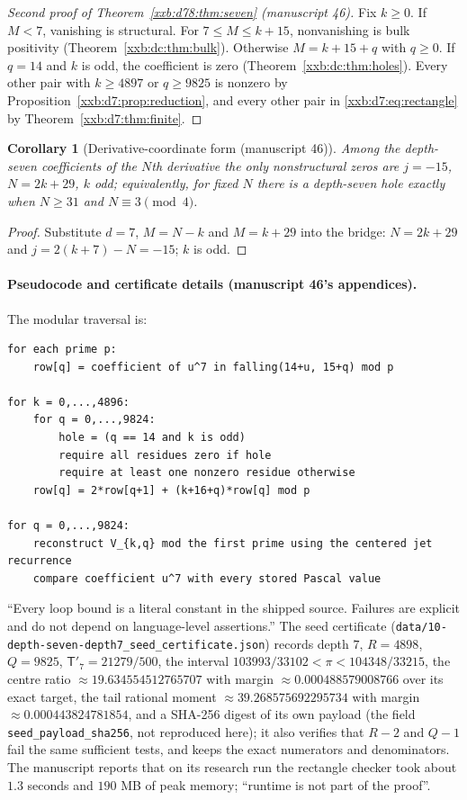 \documentclass[11pt,a4paper]{article}
\numberwithin{equation}{section}
\newtheorem{corollary}[theorem]{Corollary}
\theoremstyle{definition}
\theoremstyle{remark}
\theoremstyle{plain}
\begin{document}
\begin{proof}[Second proof of Theorem~\ref{xxb:d78:thm:seven} (manuscript 46)]
Fix $k\ge0$.  If $M<7$, vanishing is structural.  For $7\le M\le k+15$,
nonvanishing is bulk positivity (Theorem~\ref{xxb:dc:thm:bulk}).  Otherwise
$M=k+15+q$ with $q\ge0$.  If $q=14$ and $k$ is odd, the coefficient is zero
(Theorem~\ref{xxb:dc:thm:holes}).  Every other pair with $k\ge4897$ or
$q\ge9825$ is nonzero by Proposition~\ref{xxb:d7:prop:reduction}, and every
other pair in \eqref{xxb:d7:eq:rectangle} by
Theorem~\ref{xxb:d7:thm:finite}.
\end{proof}

\begin{corollary}[Derivative-coordinate form (manuscript 46)]\label{xxb:d7:cor:derivative}
Among the depth-seven coefficients of the $N$th derivative the only
nonstructural zeros are $j=-15$, $N=2k+29$, $k$ odd; equivalently, for fixed
$N$ there is a depth-seven hole exactly when $N\ge31$ and $N\equiv3\pmod4$.
\end{corollary}
\begin{proof}
Substitute $d=7$, $M=N-k$ and $M=k+29$ into the bridge: $N=2k+29$ and
$j=2(k+7)-N=-15$; $k$ is odd.
\end{proof}

\paragraph{Pseudocode and certificate details (manuscript 46's appendices).}
The modular traversal is:
\begin{lstlisting}
for each prime p:
    row[q] = coefficient of u^7 in falling(14+u, 15+q) mod p

for k = 0,...,4896:
    for q = 0,...,9824:
        hole = (q == 14 and k is odd)
        require all residues zero if hole
        require at least one nonzero residue otherwise
    row[q] = 2*row[q+1] + (k+16+q)*row[q] mod p

for q = 0,...,9824:
    reconstruct V_{k,q} mod the first prime using the centered jet recurrence
    compare coefficient u^7 with every stored Pascal value
\end{lstlisting}
``Every loop bound is a literal constant in the shipped source.  Failures are
explicit and do not depend on language-level assertions.''  The seed
certificate
(\texttt{data/10-depth-\allowbreak seven-\allowbreak depth7\_seed\_certificate.json})
records depth $7$, $R=4898$, $Q=9825$, $\mathsf T'_7=21279/500$, the interval
$103993/33102<\pi<104348/33215$, the centre ratio $\approx19.634554512765707$
with margin $\approx0.000488579008766$ over its exact target, the tail rational
moment $\approx39.268575692295734$ with margin $\approx0.000443824781854$, and
a SHA-256 digest of its own payload (the field \texttt{seed\_payload\_sha256},
not reproduced here); it also verifies that $R-2$ and $Q-1$ fail the same
sufficient tests, and keeps the exact numerators and denominators.  The
manuscript reports that on its research run the rectangle checker took about
$1.3$ seconds and $190$ MB of peak memory; ``runtime is not part of the
proof''.
\end{document}
